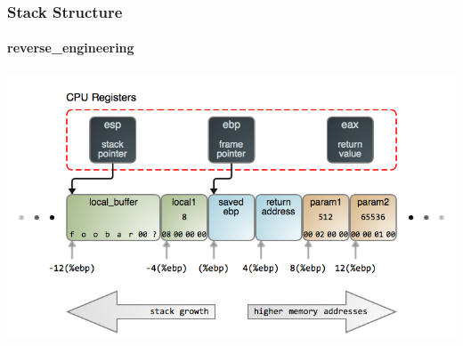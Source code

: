 \documentclass[aspectratio=169]{beamer}
\begin{document}
\begin{frame}
  \frametitle{Stack Structure}
  \framesubtitle{reverse\_engineering}
  \begin{center}
    \includegraphics[scale=0.42]{the-stack}
  \end{center}
\end{frame}
\end{document}
